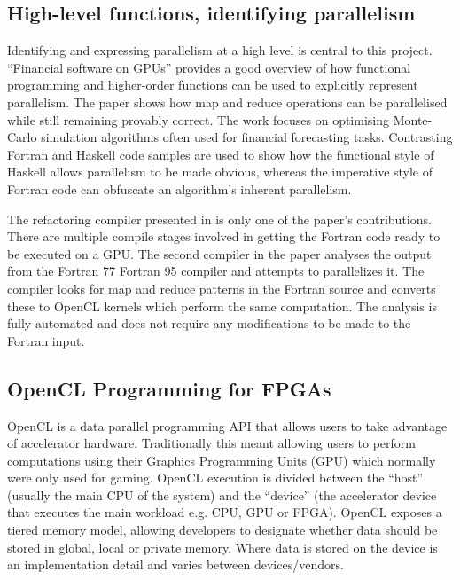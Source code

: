 \documentclass{mpaper}
\begin{document}
\subsection{High-level functions, identifying parallelism}

Identifying and expressing parallelism at a high level is central to this project.
``Financial software on GPUs'' \cite{Oancea2012} provides a good overview of how functional programming and higher-order functions can be used to explicitly represent parallelism.
The paper shows how map and reduce operations can be parallelised while still remaining provably correct.
The work focuses on optimising Monte-Carlo simulation algorithms often used for financial forecasting tasks.
Contrasting Fortran and Haskell code samples are used to show how the functional style of Haskell allows parallelism to be made obvious, whereas the imperative style of Fortran code can obfuscate an algorithm's inherent parallelism.

The refactoring compiler presented in \cite{VanderbauwhedeDavidson2018} is only one of the paper's contributions. 
There are multiple compile stages involved in getting the Fortran code ready to be executed on a GPU.
The second compiler in the paper analyses the output from the Fortran 77 \textrightarrow Fortran 95 compiler and attempts to parallelizes it.
The compiler looks for map and reduce patterns in the Fortran source and converts these to OpenCL kernels which perform the same computation.
The analysis is fully automated and does not require any modifications to be made to the Fortran input.


\subsection{OpenCL Programming for FPGAs}
\label{FPGA_OpenCL}

OpenCL is a data parallel programming API that allows users to take advantage of accelerator hardware. 
Traditionally this meant allowing users to perform computations using their Graphics Programming Units (GPU) which normally were only used for gaming.
OpenCL execution is divided between the ``host'' (usually the main CPU of the system) and the ``device'' (the accelerator device that executes the main workload e.g. CPU, GPU or FPGA).
OpenCL exposes a tiered memory model, allowing developers to designate whether data should be stored in global, local or private memory.
Where data is stored on the device is an implementation detail and varies between devices/vendors.
\end{document}

